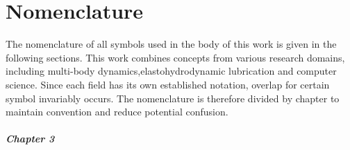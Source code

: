 
\chapter*{Nomenclature}

The nomenclature of all symbols used in the body of this work is given in the following sections. This work combines concepts from various research domains, including multi-body dynamics,elastohydrodynamic lubrication and computer science. Since each field has its own established notation, overlap for certain symbol invariably occurs. The nomenclature is therefore divided by chapter to maintain convention and reduce potential confusion.

\paragraph{Chapter 3}

